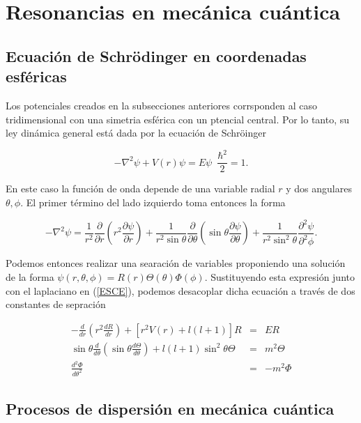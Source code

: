 \chapter{Resonancias en mecánica cuántica}

\section{Ecuación de Schrödinger en coordenadas esféricas}

Los potenciales creados en la subsecciones anteriores corrsponden al caso tridimensional con una simetria esférica con un ptencial central. Por lo tanto, su ley dinámica general está dada por la ecuación de Schröinger

\begin{equation}
-\nabla^2 \psi + V(r) \psi = E \psi \,\,\, \frac{\hbar^2}{2}= 1. \label{ESCE}
\end{equation}

En este caso la función de onda depende de una variable radial $r$ y dos angulares $\theta, \phi$. El primer término del lado izquierdo toma entonces la forma

\begin{equation*}
-\nabla^2 \psi = \frac{1}{r^2} \frac{\partial}{\partial r} \left(r^2 \frac{\partial \psi}{\partial r} \right) + \frac{1}{r^2 \sin \theta} \frac{\partial}{\partial \theta} \left(\sin \theta \frac{\partial \psi}{\partial \theta} \right) +  \frac{1}{r^2 \sin^2 \theta} \frac{\partial^2 \psi}{\partial^2 \phi}.
\end{equation*}

Podemos entonces realizar una searación de variables proponiendo una solución de la forma $\psi(r, \theta, \phi)= R(r)\Theta(\theta)\Phi(\phi)$. Sustituyendo esta expresión junto con el laplaciano en (\ref{ESCE}), podemos desacoplar dicha ecuación a través de dos constantes de sepración

\begin{eqnarray*}
-\frac{d}{dr}\left(r^2 \frac{d R}{dr} \right) + [r^2 V(r) +  l (l + 1)]R &=& E R
\\
\sin{\theta}\frac{d}{d\theta}\left(\sin{\theta}\frac{d\Theta}{d\theta} \right)+l(l+1)\sin^2{\theta} \Theta &=& m^2 \Theta
\\
\frac{d^2 \Phi}{d \theta^2} &=& -m^2 \Phi
\end{eqnarray*}

\section{Procesos de dispersión en mecánica cuántica}

